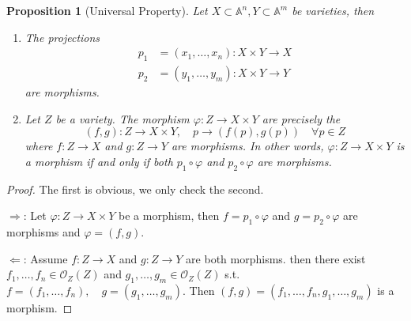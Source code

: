 \documentclass{amsart}
\theoremstyle{plain}
\newtheorem{proposition}{Proposition}
\theoremstyle{definition}
\theoremstyle{remark}
\numberwithin{equation}{section}
\begin{document}
\begin{proposition}[Universal Property]\label{19}
	Let $ X\subset\mathbb{A}^n,Y \subset \mathbb{A}^m$ be varieties, then
	\begin{enumerate}
		\item The projections
		$$\begin{array}{cc}
		p_1 & =(x_1,\dots,x_n): X\times Y\to X\\
		p_2 & =(y_1,\dots,y_m): X\times Y\to Y
		\end{array}$$
		are morphisms.
		\item Let $ Z $ be a variety. The morphism $ \varphi : Z\to X \times Y $ are precisely the
		$$
		(f,g):Z\to X\times Y,\quad p\to (f(p),g(p))\quad\forall p\in Z
		$$
		where $ f:Z\to X $ and $ g:Z\to Y $ are morphisms. In other words, $ \varphi:Z\to X\times Y $ is a morphism if and only if both $ p_1\circ \varphi $ and $ p_2\circ\varphi  $ are morphisms.
	\end{enumerate}
\end{proposition}
\begin{proof}
	The first is obvious, we only check the second.
	
	$ \Rightarrow $: Let $ \varphi:Z\to X\times Y $ be a morphism, then $ f=p_1\circ\varphi $ and $ g=p_2\circ\varphi $ are morphisms and $ \varphi=(f,g) $.
	
	$ \Leftarrow $: Assume $ f:Z\to X $ and $ g:Z\to Y $ are both morphisms. then there exist $ f_1,\dots,f_n\in \mathcal{O}_Z(Z) $ and $ g_1,\dots,g_m\in \mathcal{O}_Z(Z) $ s.t.
	$ f=(f_1,\dots,f_n),\quad g=(g_1,\dots,g_m) $. Then $ (f,g)=(f_1,\dots,f_n,g_1,\dots,g_m) $ is a morphism.
\end{proof}
 
\end{document}
